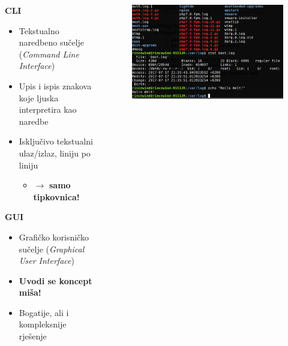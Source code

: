 \documentclass{beamer}
\begin{document}
\begin{frame}[t]
\begin{columns}
\begin{column}{.7\textwidth}
    \textbf{CLI}
    \begin{itemize}
      \item Tekstualno naredbeno sučelje (\textit{Command Line Interface})
      \item Upis i ispis znakova koje ljuska interpretira kao naredbe
      \item Isključivo tekstualni ulaz/izlaz, liniju po liniju
      \begin{footnotesize}
        \begin{itemize}
          \item $\rightarrow$ \textbf{samo tipkovnica!}
        \end{itemize}
      \end{footnotesize}  
    \end{itemize}
    \vfill
    \textbf{GUI}
    \begin{itemize}
      \item Grafičko korisničko sučelje (\textit{Graphical User Interface})
      \item \textbf{Uvodi se koncept miša!}
      \item Bogatije, ali i kompleksnije rješenje
    \end{itemize}
    \end{column}
    \begin{column}{.3\textwidth}
      \begin{figure}[t]
        \begin{minipage}{\textwidth}
          \centering
          \includegraphics[width=\linewidth]{cli.png}
        \end{minipage}
      \end{figure}
      \begin{figure}[t]

\end{figure}
\end{column}
\end{columns}
\end{frame}
\end{document}
